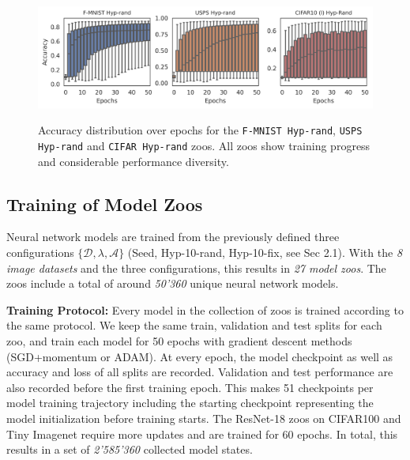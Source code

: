 \begin{figure}[]
\begin{minipage}[t]{1.00\textwidth}
\begin{center}
\includegraphics[trim=0in 0in 0in 0in, width=0.85\linewidth]{imgs/boxplots_mix.png}
\vspace{-8pt}
\caption{
Accuracy distribution over epochs for the \texttt{F-MNIST Hyp-rand}, \texttt{USPS Hyp-rand} and \texttt{CIFAR Hyp-rand} zoos. All zoos show training progress and considerable performance diversity.
}
\vspace{-10pt}

\label{fig:boxplots}    
\end{center}
\end{minipage}
\end{figure}


%
%
\subsection{Training of Model Zoos}
\vspace{-4pt}
Neural network models are trained from the previously defined three configurations 
$\{\mathcal{D}, \lambda, \mathcal{A}\}$ (Seed, Hyp-10-rand, Hyp-10-fix, see Sec 2.1). With the \textit{8 image datasets} and the three configurations, 
this results in \textit{27 model zoos}.
%
%
The zoos include a total of around \textit{50'360} unique neural network models.

\textbf{Training Protocol:}
Every model in the collection of zoos is trained according to the same protocol. 
We keep the same train, validation and test splits for each zoo, and train each model for 50 epochs with gradient descent methods (SGD+momentum or ADAM). 
At every epoch, the model checkpoint as well as accuracy and loss of all splits are recorded. 
Validation and test performance are also recorded before the first training epoch.
This makes 51 checkpoints per model training trajectory including the starting checkpoint 
representing the model initialization before training starts. 
The ResNet-18 zoos on CIFAR100 and Tiny Imagenet require more updates and are trained for 60 epochs.
In total, this results in a set of \textit{2’585’360} collected model states.


